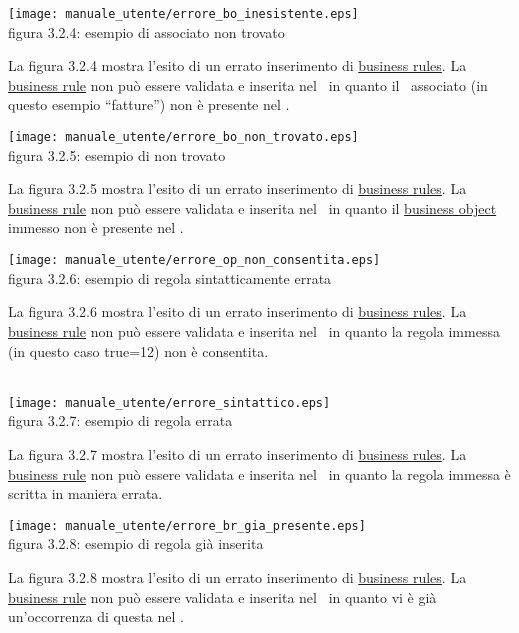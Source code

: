 \begin{center}
\texttt{[image: manuale\_utente/errore\_bo\_inesistente.eps]}\\
 figura 3.2.4: esempio di \bo associato non trovato
\end{center} 
La figura 3.2.4 mostra l'esito di un errato inserimento di \underline{business rules}. La \underline{business rule} non pu\`o essere validata e inserita nel \rp\ in quanto il \bo\ associato (in questo esempio ``fatture'') non \`e presente nel \rp.

\begin{center}
\texttt{[image: manuale\_utente/errore\_bo\_non\_trovato.eps]}\\
 figura 3.2.5: esempio di \bo non trovato
\end{center} 
La figura 3.2.5 mostra l'esito di un errato inserimento di \underline{business rules}. La \underline{business rule} non pu\`o essere validata e inserita nel \rp\ in quanto il \underline{business object} immesso non \`e presente nel \rp.

\begin{center}
\texttt{[image: manuale\_utente/errore\_op\_non\_consentita.eps]}\\
 figura 3.2.6: esempio di regola sintatticamente errata 
\end{center} 
La figura 3.2.6 mostra l'esito di un errato inserimento di \underline{business rules}. La \underline{business rule} non pu\`o essere validata e inserita nel \rp\ in quanto la regola immessa (in questo caso true=12) non \`e consentita.
\\
\\
\begin{center}
\texttt{[image: manuale\_utente/errore\_sintattico.eps]}\\
 figura 3.2.7: esempio di regola errata
\end{center} 
La figura 3.2.7 mostra l'esito di un errato inserimento di \underline{business rules}. La \underline{business rule} non pu\`o essere validata e inserita nel \rp\ in quanto la regola immessa \`e scritta in maniera errata.

\begin{center}
\texttt{[image: manuale\_utente/errore\_br\_gia\_presente.eps]}\\
 figura 3.2.8: esempio di regola gi\`a inserita
\end{center} 
La figura 3.2.8 mostra l'esito di un errato inserimento di \underline{business rules}. La \underline{business rule} non pu\`o essere validata e inserita nel \rp\ in quanto vi \`e gi\`a un'occorrenza di questa nel \rp.


